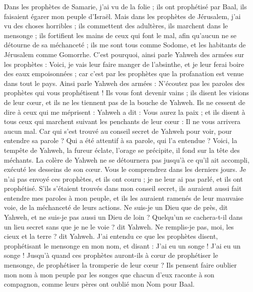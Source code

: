 \begin{multicols}{2}
Dans les prophètes de Samarie, j'ai vu de la folie ; ils ont prophétisé par Baal, ils faisaient égarer mon peuple d'Israël.
Mais dans les prophètes de Jérusalem, j'ai vu des choses horribles ; ils commettent des adultères, ils marchent dans le mensonge ; ils fortifient les mains de ceux qui font le mal, afin qu'aucun ne se détourne de sa méchanceté ; ils me sont tous comme Sodome, et les habitants de Jérusalem comme Gomorrhe.
C'est pourquoi, ainsi parle Yahweh des armées sur les prophètes : Voici, je vais leur faire manger de l'absinthe, et je leur ferai boire des eaux empoisonnées ; car c'est par les prophètes que la profanation est venue dans tout le pays.
Ainsi parle Yahweh des armées : N'écoutez pas les paroles des prophètes qui vous prophétisent ! Ils vous font devenir vains ; ils disent les visions de leur cœur, et ils ne les tiennent pas de la bouche de Yahweh.
Ils ne cessent de dire à ceux qui me méprisent : Yahweh a dit : Vous aurez la paix ; et ils disent à tous ceux qui marchent suivant les penchants de leur cœur : Il ne vous arrivera aucun mal.
Car qui s'est trouvé au conseil secret de Yahweh pour voir, pour entendre sa parole ? Qui a été attentif à sa parole, qui l'a entendue ?
Voici, la tempête de Yahweh, la fureur éclate, l'orage se précipite, il fond sur la tête des méchants.
La colère de Yahweh ne se détournera pas jusqu'à ce qu'il ait accompli, exécuté les desseins de son cœur. Vous le comprendrez dans les derniers jours.
Je n'ai pas envoyé ces prophètes, et ils ont couru ; je ne leur ai pas parlé, et ils ont prophétisé.
S'ils s'étaient trouvés dans mon conseil secret, ils auraient aussi fait entendre mes paroles à mon peuple, et ils les auraient ramenés de leur mauvaise voie, de la méchanceté de leurs actions.
Ne suis-je un Dieu que de près, dit Yahweh, et ne suis-je pas aussi un Dieu de loin ?
Quelqu'un se cachera-t-il dans un lieu secret sans que je ne le voie ? dit Yahweh. Ne remplis-je pas, moi, les cieux et la terre ? dit Yahweh.
J'ai entendu ce que les prophètes disent, prophétisant le mensonge en mon nom, et disant : J'ai eu un songe ! J'ai eu un songe !
Jusqu'à quand ces prophètes auront-ils à cœur de prophétiser le mensonge, de prophétiser la tromperie de leur cœur ?
Ils pensent faire oublier mon nom à mon peuple par les songes que chacun d'eux raconte à son compagnon, comme leurs pères ont oublié mon Nom pour Baal.

\end{multicols}
